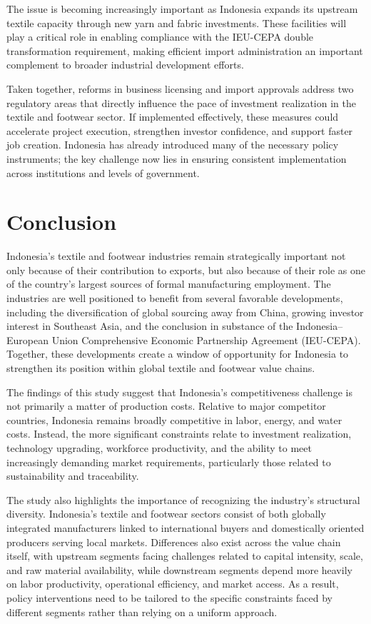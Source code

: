 \documentclass[
  manuscript=article,
  layout=publish,
  year=2026,
  volume=1,
]{den}
\begin{document}
The issue is becoming increasingly important as Indonesia expands its
upstream textile capacity through new yarn and fabric investments. These
facilities will play a critical role in enabling compliance with the
IEU-CEPA double transformation requirement, making efficient import
administration an important complement to broader industrial development
efforts.

Taken together, reforms in business licensing and import approvals
address two regulatory areas that directly influence the pace of
investment realization in the textile and footwear sector. If
implemented effectively, these measures could accelerate project
execution, strengthen investor confidence, and support faster job
creation. Indonesia has already introduced many of the necessary policy
instruments; the key challenge now lies in ensuring consistent
implementation across institutions and levels of government.

\section{Conclusion}\label{conclusion}

Indonesia's textile and footwear industries remain strategically
important not only because of their contribution to exports, but also
because of their role as one of the country's largest sources of formal
manufacturing employment. The industries are well positioned to benefit
from several favorable developments, including the diversification of
global sourcing away from China, growing investor interest in Southeast
Asia, and the conclusion in substance of the Indonesia--European Union
Comprehensive Economic Partnership Agreement (IEU-CEPA). Together, these
developments create a window of opportunity for Indonesia to strengthen
its position within global textile and footwear value chains.

The findings of this study suggest that Indonesia's competitiveness
challenge is not primarily a matter of production costs. Relative to
major competitor countries, Indonesia remains broadly competitive in
labor, energy, and water costs. Instead, the more significant
constraints relate to investment realization, technology upgrading,
workforce productivity, and the ability to meet increasingly demanding
market requirements, particularly those related to sustainability and
traceability.

The study also highlights the importance of recognizing the industry's
structural diversity. Indonesia's textile and footwear sectors consist
of both globally integrated manufacturers linked to international buyers
and domestically oriented producers serving local markets. Differences
also exist across the value chain itself, with upstream segments facing
challenges related to capital intensity, scale, and raw material
availability, while downstream segments depend more heavily on labor
productivity, operational efficiency, and market access. As a result,
policy interventions need to be tailored to the specific constraints
faced by different segments rather than relying on a uniform approach.
\end{document}
